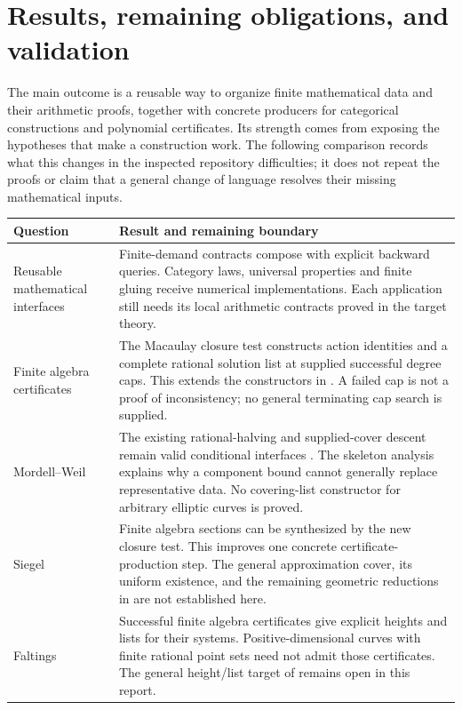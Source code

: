 \section{Results, remaining obligations, and validation}

The main outcome is a reusable way to organize finite mathematical data and
their arithmetic proofs, together with concrete producers for categorical
constructions and polynomial certificates. Its strength comes from exposing
the hypotheses that make a construction work. The following comparison records
what this changes in the inspected repository difficulties; it does not repeat
the proofs or claim that a general change of language resolves their missing
mathematical inputs.

\begin{longtable}{@{}P{.23\linewidth}P{.70\linewidth}@{}}
\toprule
Question & Result and remaining boundary\\
\midrule\endhead
Reusable mathematical interfaces & Finite-demand contracts compose with
explicit backward queries. Category laws, universal properties and finite
gluing receive numerical implementations. Each application still needs its
local arithmetic contracts proved in the target theory.\\
Finite algebra certificates & The Macaulay closure test constructs action
identities and a complete rational solution list at supplied successful degree
caps. This extends the constructors in \cite{repo-witnesses}. A failed cap is
not a proof of inconsistency; no general terminating cap search is supplied.\\
Mordell--Weil & The existing rational-halving and supplied-cover descent
remain valid conditional interfaces \cite{repo-mw}. The skeleton analysis
explains why a component bound cannot generally replace representative data.
No covering-list constructor for arbitrary elliptic curves is proved.\\
Siegel & Finite algebra sections can be synthesized by the new closure test.
This improves one concrete certificate-production step. The general
approximation cover, its uniform existence, and the remaining geometric
reductions in \cite{repo-siegel} are not established here.\\
Faltings & Successful finite algebra certificates give explicit heights and
lists for their systems. Positive-dimensional curves with finite rational
point sets need not admit those certificates. The general height/list target
of \cite{repo-faltings} remains open in this report.\\

\end{longtable}
